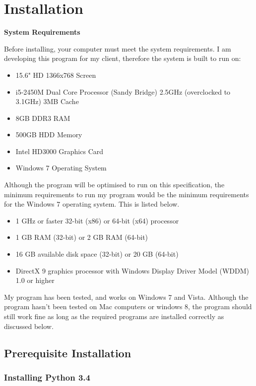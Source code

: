 \section{Installation}

\textbf{System Requirements}

Before installing, your computer must meet the system requirements. I am developing this program for my client, therefore the system is built to run on:

\begin{itemize}
    \item 15.6" HD 1366x768 Screen
    \item i5-2450M Dual Core Processor (Sandy Bridge) 2.5GHz (overclocked to 3.1GHz) 3MB Cache
    \item 8GB DDR3 RAM
    \item 500GB HDD Memory
    \item Intel HD3000 Graphics Card
    \item Windows 7 Operating System
\end{itemize}

Although the program will be optimised to run on this specification, the minimum requirements to run my program would be the minimum requirements for the Windows 7 operating system. This is listed below.

\begin{itemize}
\item 1 GHz or faster 32-bit (x86) or 64-bit (x64) processor
\item 1 GB RAM (32-bit) or 2 GB RAM (64-bit)
\item 16 GB available disk space (32-bit) or 20 GB (64-bit) 
\item DirectX 9 graphics processor with Windows Display Driver Model (WDDM) 1.0 or higher

\end{itemize} 
My program has been tested, and works on Windows 7 and Vista. Although the program hasn't been tested on Mac computers or windows 8, the program should still work fine as long as the required programs are installed correctly as discussed below.




\subsection{Prerequisite Installation}


\subsubsection{Installing Python 3.4}

